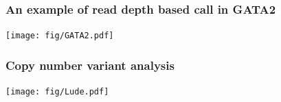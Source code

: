\documentclass{beamer}
\begin{document}
\begin{frame}
  \frametitle{An example of read depth based call in GATA2}
  \begin{center}
    \texttt{[image: fig/GATA2.pdf]}
  \end{center}
\end{frame}


\begin{frame}
  \frametitle{Copy number variant analysis}
  \texttt{[image: fig/Lude.pdf]}
\end{frame}
\end{document}
